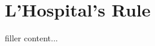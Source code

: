 \documentclass[../../templates/section]{subfiles}
\begin{document}
\section{L'Hospital's Rule}\label{sec:lhospitals-rule}

filler content...
\end{document}
